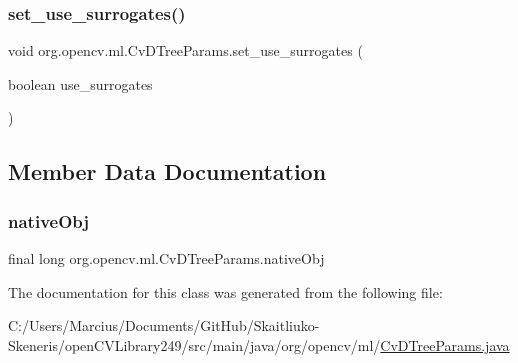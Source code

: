 \subsubsection{\texorpdfstring{set\+\_\+use\+\_\+surrogates()}{set\_use\_surrogates()}}
{\footnotesize\ttfamily void org.\+opencv.\+ml.\+Cv\+D\+Tree\+Params.\+set\+\_\+use\+\_\+surrogates (\begin{DoxyParamCaption}\item[{boolean}]{use\+\_\+surrogates }\end{DoxyParamCaption})}



\subsection{Member Data Documentation}
\mbox{\label{classorg_1_1opencv_1_1ml_1_1_cv_d_tree_params_a7dac017cdb59af8aa6880a6a21366ef5}} 
\subsubsection{\texorpdfstring{native\+Obj}{nativeObj}}
{\footnotesize\ttfamily final long org.\+opencv.\+ml.\+Cv\+D\+Tree\+Params.\+native\+Obj\hspace{0.3cm}{\ttfamily [protected]}}



The documentation for this class was generated from the following file\+:\begin{DoxyCompactItemize}
\item 
C\+:/\+Users/\+Marcius/\+Documents/\+Git\+Hub/\+Skaitliuko-\/\+Skeneris/open\+C\+V\+Library249/src/main/java/org/opencv/ml/\mbox{\hyperlink{_cv_d_tree_params_8java}{Cv\+D\+Tree\+Params.\+java}}\end{DoxyCompactItemize}
